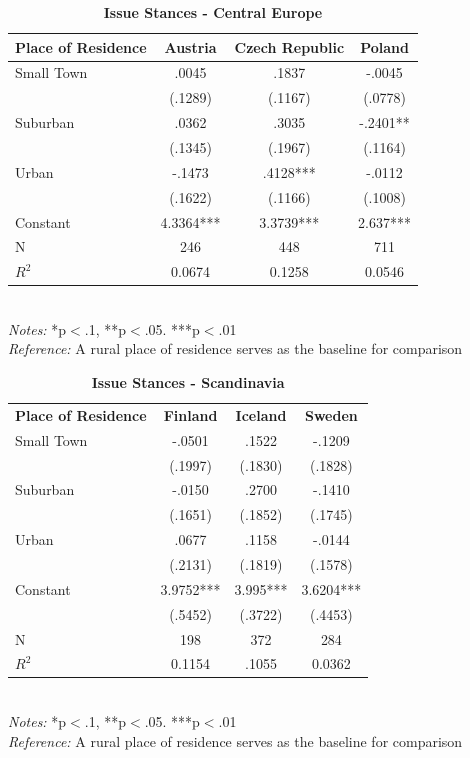 \documentclass[12pt, titlepage]{article}
\newcommand\e{\emph}
\newcommand\tb{\textbf}
\begin{document}
\begin{singlespace}
	\begin{table}[H]
		\centering
		\caption{\tb{Issue Stances - Central Europe}}
		\begin{tabulary}{\linewidth}{l c c c }
			\\
			\hline
			\tb{Place of Residence} &\tb{Austria}&\tb{Czech Republic}& \tb{Poland} \\
			\hline
			Small Town &.0045 &.1837  &-.0045   \\
			&(.1289)&(.1167) &(.0778)  \\
			Suburban& .0362 &.3035  &-.2401**   \\
			&(.1345) &(.1967) &(.1164)\\
			Urban&-.1473&.4128***  &-.0112    \\
			&(.1622)& (.1166)  &(.1008)    \\
			Constant&4.3364*** &3.3739***  &2.637***     \\
			N&246 & 448  & 711   \\
			$R^2$&0.0674&0.1258  &0.0546  \\
			\hline 
\end{tabulary}
\\
\e{Notes:} *p$<$.1, **p$<$.05. ***p$<$.01 \\
\e{Reference:} A rural place of residence serves as the baseline for comparison
\label{CELib}
\end{table}
\end{singlespace}

\begin{singlespace}
	\begin{table}[H]
		\centering
		\caption{\tb{Issue Stances - Scandinavia}}
		\begin{tabulary}{\linewidth}{l c c c}
			\\
			\hline
			\tb{Place of Residence}&\tb{Finland}&\tb{Iceland}&\tb{Sweden} \\
			Small Town& -.0501 &.1522 & -.1209 \\
			&(.1997) & (.1830) & (.1828) \\
			Suburban&-.0150&.2700  &-.1410  \\
			&(.1651) &(.1852) & (.1745) \\
			Urban &.0677 &.1158  & -.0144 \\
			&(.2131) & (.1819) & (.1578) \\
			Constant&3.9752*** &3.995***  & 3.6204*** \\
			&(.5452) &(.3722) & (.4453) \\
			N&198&372 &284  \\
			$R^2$&0.1154&.1055  & 0.0362 \\  
			\hline
\end{tabulary}
\\
\e{Notes:} *p$<$.1, **p$<$.05. ***p$<$.01 \\
\e{Reference:} A rural place of residence serves as the baseline for comparison
\label{ScanLib}
\end{table}
\end{singlespace}
			
\end{document}
